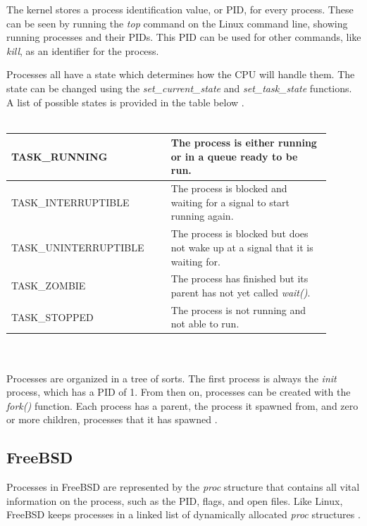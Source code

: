 \documentclass[10pt,draftclsnofoot,onecolumn,journal,compsoc]{IEEEtran}
\begin{document}
The kernel stores a process identification value, or PID, for every process. These can be seen by running the \textit{top} command on the Linux command line, showing running processes and their PIDs. This PID can be used for other commands, like \textit{kill}, as an identifier for the process.

Processes all have a state which determines how the CPU will handle them. The state can be changed using the \textit{set\_current\_state} and \textit{set\_task\_state} functions. A list of possible states is provided in the table below \cite{linux_proc}. \\ \\

\begin{tabular}{ | p{0.45\linewidth} | p{0.45\linewidth} | }
    \hline
    TASK\_RUNNING & The process is either running or in a queue ready to be run. \\ \hline
    TASK\_INTERRUPTIBLE & The process is blocked and waiting for a signal to start running again. \\ \hline
    TASK\_UNINTERRUPTIBLE & The process is blocked but does not wake up at a signal that it is waiting for. \\ \hline
    TASK\_ZOMBIE & The process has finished but its parent has not yet called \textit{wait()}. \\ \hline
    TASK\_STOPPED & The process is not running and not able to run. \\ \hline
\end{tabular} \\ \\ 

Processes are organized in a tree of sorts. The first process is always the \textit{init} process, which has a PID of 1. From then on, processes can be created with the \textit{fork()} function. Each process has a parent, the process it spawned from, and zero or more children, processes that it has spawned \cite{linux_proc}.

\subsection{FreeBSD}
Processes in FreeBSD are represented by the \textit{proc} structure that contains all vital information on the process, such as the PID, flags, and open files. Like Linux, FreeBSD keeps processes in a linked list of dynamically allocated \textit{proc} structures \cite{bsd_proc}. 
\end{document}
